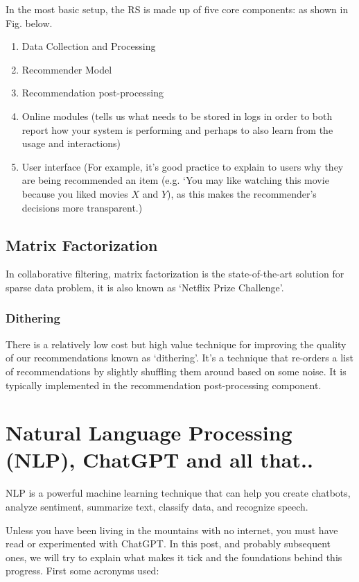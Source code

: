 \documentclass[11pt]{article}
\begin{document}
In the most basic setup, the RS is made up of five core components:
as shown in Fig. below. 

\begin{enumerate}
\item Data Collection and Processing 
\item Recommender Model
\item Recommendation post-processing
\item Online modules (tells us what needs to be stored in logs in order to both report how your system is performing and perhaps to also learn from the usage and interactions)
\item User interface (For example, it’s good practice to explain to users why they are being recommended an item (e.g. `You may like watching this movie because you liked movies $X$ and $Y$), as this makes the recommender’s decisions more transparent.)
\end{enumerate} 


\subsection{Matrix Factorization}

In collaborative filtering, matrix factorization is the state-of-the-art solution for sparse data problem, it is also known as `Netflix Prize Challenge'.


\subsubsection{Dithering}

There is a relatively low cost but high value technique for improving the quality of our 
recommendations known as `dithering'. It’s a technique that re-orders a list of recommendations by slightly shuffling them around based on some noise. 
It is typically implemented in the recommendation post-processing component.





\section{Natural Language Processing (NLP), ChatGPT and all that..}

NLP is a powerful machine learning technique that can help you create chatbots, 
analyze sentiment, summarize text, classify data, and recognize speech.

Unless you have been living in the mountains with no internet, you must have read 
or experimented with ChatGPT. In this post, and probably subsequent ones, we will try to explain 
what makes it tick and the foundations behind this progress. First some acronyms used:
\end{document}
